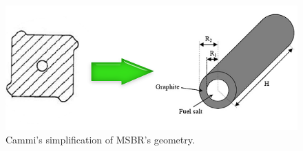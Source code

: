\documentclass{article}
\begin{document}
\begin{figure}[htpb]
  \centering
  \includegraphics{Cammi_simplification_1.png}
  \caption{Cammi's simplification of MSBR's geometry. \cite{cammi_multi-physics_2011}}
  \label{fig:simlification}
\end{figure}

\FloatBarrier



\end{document}
